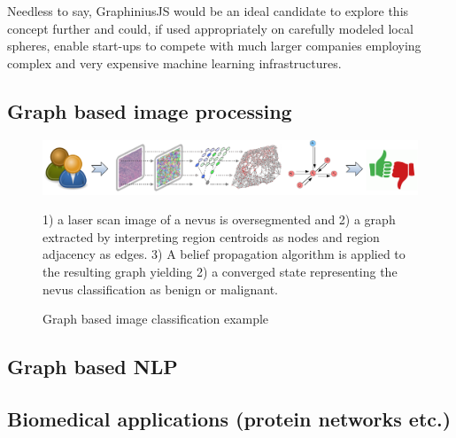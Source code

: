 	Needless to say, GraphiniusJS would be an ideal candidate to explore this concept further and could, if used appropriately on carefully modeled local spheres, enable start-ups to compete with much larger companies employing complex and very expensive machine learning infrastructures.
	
	
	
	
	
	\subsection{Graph based image processing}
	\label{ssect:app_graph_img_proc}
	
	\begin{figure}[ht]
		\label{fig_graph_based_img_classification}
		\begin{center}
			\includegraphics[width=1\textwidth]{figures/graph_img_class}
			\caption{Graph based image classification example}
		\end{center}
		\small
		1) a laser scan image of a nevus is oversegmented and 2) a graph extracted by interpreting region centroids as nodes and region adjacency as edges. 3) A belief propagation algorithm is applied to the resulting graph yielding 2) a converged state representing the nevus classification as benign or malignant.
	\end{figure}
	
	\subsection{Graph based NLP}
	\label{ssect:app_graph_nlp}
	
	\subsection{Biomedical applications (protein networks etc.)}
	\label{ssect:app_biomed}
	
